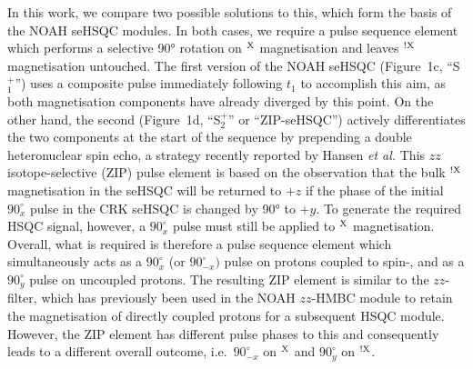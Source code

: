 \documentclass[final,twocolumn]{elsarticle}
\newcommand*{\noahSpa}{S$^+_1$}
\newcommand*{\noahSpb}{S$^+_2$}
\newcommand*{\proton}{\ce{^{1}H}}
\newcommand*{\magn}[1]{\ce{^1H}$^{#1}$}
\newcommand*{\magnnot}[1]{\ce{^1H}$^{!#1}$}
\begin{document}
In this work, we compare two possible solutions to this, which form the basis of the NOAH seHSQC modules.
In both cases, we require a pulse sequence element which performs a selective \ang{90} rotation on \magn{\ce{X}} magnetisation and leaves \magnnot{\ce{X}} magnetisation untouched.
The first version of the NOAH seHSQC (Figure~1c, ``\noahSpa'') uses a composite \proton{} pulse immediately following $t_1$ to accomplish this aim, as both magnetisation components have already diverged by this point.
On the other hand, the second (Figure~1d, ``\noahSpb'' or ``ZIP-seHSQC'') actively differentiates the two components at the start of the sequence by prepending a double heteronuclear spin echo, a strategy recently reported by Hansen \textit{et al.}\cite{Hansen2021AC}
This $zz$ isotope-selective (ZIP) pulse element is based on the observation that the bulk \magnnot{\ce{X}} magnetisation in the seHSQC will be returned to $+z$ if the phase of the initial \proton{} $90^\circ_{x}$ pulse in the CRK seHSQC is changed by \ang{90} to $+y$.
To generate the required HSQC signal, however, a \proton{} $90^\circ_x$ pulse must still be applied to \magn{\ce{X}} magnetisation.
Overall, what is required is therefore a pulse sequence element which simultaneously acts as a $90^\circ_x$ (or $90^\circ_{-x})$ pulse on protons coupled to spin-, and as a $90^\circ_y$ pulse on uncoupled protons.
The resulting ZIP element is similar to the $zz$-filter, which has previously been used in the NOAH $zz$-HMBC module to retain the magnetisation of directly coupled protons for a subsequent HSQC module.\cite{Kupce2018CC, Kupce2019JMR}
However, the ZIP element has different pulse phases to this and consequently leads to a different overall outcome, i.e.\ $90^\circ_{-x}$ on \magn{\ce{X}} and $90^\circ_y$ on \magnnot{\ce{X}}.
\end{document}
